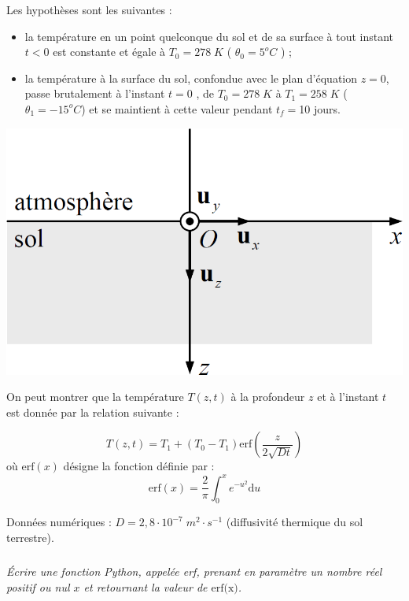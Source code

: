 \documentclass[10pt,oneside]{article}
\begin{document}
\begin{minipage}[c]{.6\linewidth}
Les hypothèses sont les suivantes :
\begin{itemize}
\item la température en un point quelconque du sol et de sa surface à tout instant $t < 0$ est constante et égale à $T_0=278\;K$ ( $\theta_0=5^oC$ ) ;
\item la température à la surface du sol, confondue avec le plan d’équation $z = 0$, passe brutalement à l’instant $t = 0$ , de $T_0 = 278\;K$ à $T_1 =  258\; K$ ($\theta_1 = -15^o C$) et se maintient à cette valeur pendant
$t_f= $10 jours.
\end{itemize}
\end{minipage}\hfill
\begin{minipage}[c]{.35\linewidth}
\begin{center}
\includegraphics[width=.95\textwidth]{images/canalisation}
\end{center}
\end{minipage}

On peut montrer que la température $T(z, t)$ à la profondeur $z$ et à l’instant $t$ est donnée par la relation suivante :

$$
T(z,t)=T_1 + (T_0-T_1) \text{erf}\left( \dfrac{z}{2\sqrt{Dt}} \right)
$$
où $\text{erf}(x)$ désigne la fonction définie par :
$$
\text{erf}(x) = \dfrac{2}{\pi}\int^x_0 e^{-u^2} \mathrm{d}u
$$

Données numériques : $D=2,8\cdot 10^{-7} \; m^2\cdot s^{-1}$ (diffusivité thermique du sol terrestre).

\setcounter{subparagraph}{0}
\subparagraph{}
\textit{Écrire une fonction Python, appelée \textsf{erf}, prenant en paramètre un nombre réel positif ou nul $x$ et
retournant la valeur de $\text{erf(x)}$.}
\end{document}

